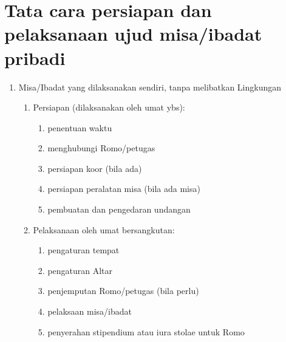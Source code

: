 \documentclass{article}
\begin{document}
\section[Tata cara persiapan dan pelaksanaan ujud \ \ \ misa/ibadat
pribadi]{Tata cara persiapan dan pelaksanaan ujud  misa/ibadat pribadi}
\begin{enumerate}
\item Misa/Ibadat yang dilaksanakan sendiri, tanpa melibatkan Lingkungan

\begin{enumerate}
\item Persiapan (dilaksanakan oleh umat ybs):

\begin{enumerate}
\item penentuan waktu
\item menghubungi Romo/petugas
\item persiapan koor (bila ada)
\item persiapan peralatan misa (bila ada misa)
\item pembuatan dan pengedaran undangan
\end{enumerate}
\item Pelaksanaan oleh umat bersangkutan:

\begin{enumerate}
\item pengaturan tempat
\item pengaturan Altar
\item penjemputan Romo/petugas (bila perlu)
\item pelaksaan misa/ibadat
\item penyerahan stipendium atau iura stolae untuk Romo
\end{enumerate}
\end{enumerate}
\end{enumerate}
\end{document}
